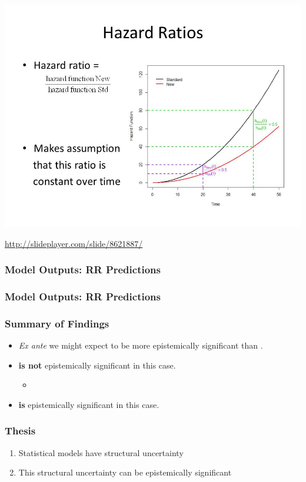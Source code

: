 \documentclass{philslides}
\begin{document}
\frame
{
	\begin{center}
	\includegraphics[height = .9\textheight]{hazard.jpg}
	\end{center}
	\vfill
	\tiny \url{http://slideplayer.com/slide/8621887/}
}
\frame
{
	\frametitle{Model Outputs: RR Predictions}
}
\frame
{
	\frametitle{Model Outputs: RR Predictions}
}
\frame
{
	\frametitle{Summary of Findings}
	\begin{itemize}
	\item \emph{Ex ante} we might expect  to be more epistemically significant than .  
	\item {} \textbf{is not} epistemically significant in this case.  
		\begin{itemize}
		\item {}
		\end{itemize}
	\item {} \textbf{is} epistemically significant in this case.  
	\end{itemize}
}
\frame
{
	\frametitle{Thesis}
	\begin{enumerate}
		\item {Statistical models have structural uncertainty}
		\item {This structural uncertainty can be epistemically significant}
	\end{enumerate}
}
	
	



\section*{}
\frame
{
	\titlepage
}

\end{document}
